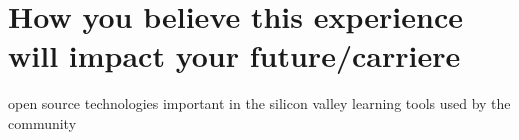 \chapter{How you believe this experience will impact  your future/carriere}
\label{ch:future}
open source technologies important in the silicon valley
learning tools used by the community
